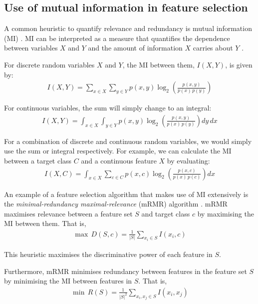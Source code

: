 \documentclass[12pt, twoside, a4paper]{report}
\begin{document}
\subsection{Use of mutual information in feature selection} \label{bg:fs:mi}

A common heuristic to quantify relevance and redundancy is mutual information (MI) \cite{RefWorks:98}. MI can be interpreted as a measure that quantifies the dependence between variables $X$ and $Y$ \cite{RefWorks:180} and the amount of information $X$ carries about $Y$ \cite{RefWorks:181}. 

For discrete random variables $X$ and $Y$, the MI between them, $I(X, Y)$, is given by:
\begin{align} \label{bg:fs:mi:dis}
I(X, Y) = \sum_{x \in X} \sum_{y \in Y} p(x, y) \log_2 \left(\frac{p(x, y)}{p(x) \, p(y)} \right) 
\end{align}

For continuous variables, the sum will simply change to an integral:
\begin{align} \label{bg:fs:mi:cont}
I(X, Y) = \int_{x \in X} \int_{y \in Y} p(x, y) \log_2 \left( \frac{p(x, y)}{p(x) \, p(y)} \right) dy \, dx
\end{align}

For a combination of discrete and continuous random variables, we would simply use the sum or integral respectively. For example, we can calculate the MI between a target class $C$ and a continuous feature $X$ by evaluating:
\begin{align*} %
I(X, C) = \int_{x \in X} \sum_{c \in C} p(x, c) \log_2 \left( \frac{p(x, c)}{p(x) \, p(c)} \right) dx
\end{align*}

An example of a feature selection algorithm that makes use of MI extensively is the \textit{minimal-redundancy maximal-relevance} (mRMR) algorithm \cite{RefWorks:182}. mRMR maximises relevance between a feature set $S$ and target class $c$ by maximising the MI between them. That is,
\begin{align*}
\max \, D(S, c) = \frac{1}{|S|} \sum_{x_i \in S} I(x_i, c)
\end{align*}

This heuristic maximises the discriminative power of each feature in $S$.

Furthermore, mRMR minimises redundancy between features in the feature set $S$ by minimising the MI between features in $S$. That is,
\begin{align*}
\min \, R(S) = \frac{1}{|S|^2} \sum_{x_i, x_j \in S} I(x_i, x_j)
\end{align*}
\end{document}
